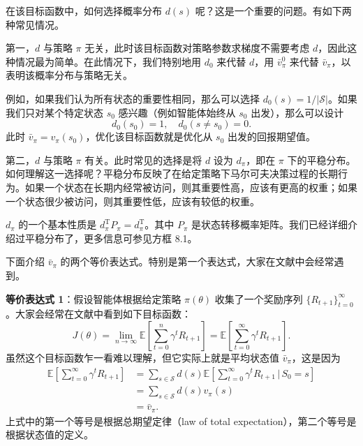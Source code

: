 在该目标函数中，如何选择概率分布 $d(s)$ 呢？这是一个重要的问题。有如下两种常见情况。

第一，$d$ 与策略 $\pi$ 无关，此时该目标函数对策略参数求梯度不需要考虑 $d$，因此这种情况最为简单。在此情况下，我们特别地用 $d_0$ 来代替 $d$，用 $\bar{v}_{\pi}^{0}$ 来代替 $\bar{v}_{\pi}$，以表明该概率分布与策略无关。

例如，如果我们认为所有状态的重要性相同，那么可以选择 $d_0(s) = 1 / |\mathcal{S}|$。如果我们只对某个特定状态 $s_0$ 感兴趣（例如智能体始终从 $s_0$ 出发），那么可以设计
\begin{equation}
d_0(s_0) = 1, \quad d_0(s \neq s_0) = 0.
\end{equation}
此时 $\bar{v}_{\pi} = v_{\pi}(s_0)$，优化该目标函数就是优化从 $s_0$ 出发的回报期望值。

第二，$d$ 与策略 $\pi$ 有关。此时常见的选择是将 $d$ 设为 $d_{\pi}$，即在 $\pi$ 下的平稳分布。如何理解这一选择呢？平稳分布反映了在给定策略下马尔可夫决策过程的长期行为。如果一个状态在长期内经常被访问，则其重要性高，应该有更高的权重；如果一个状态很少被访问，则其重要性低，应该有较低的权重。

$d_{\pi}$ 的一个基本性质是 $d_{\pi}^{\mathrm{T}}P_{\pi} = d_{\pi}^{\mathrm{T}}$。其中 $P_{\pi}$ 是状态转移概率矩阵。我们已经详细介绍过平稳分布了，更多信息可参见方框 8.1。

下面介绍 $\bar{v}_{\pi}$ 的两个等价表达式。特别是第一个表达式，大家在文献中会经常遇到。

\textbf{等价表达式 1}：假设智能体根据给定策略 $\pi(\theta)$ 收集了一个奖励序列 $\{R_{t+1}\}_{t=0}^{\infty}$。大家会经常在文献中看到如下目标函数：
\begin{equation}
J(\theta) = \lim_{n \to \infty} \mathbb{E}\left[ \sum_{t=0}^{n} \gamma^{t} R_{t+1} \right] = \mathbb{E}\left[ \sum_{t=0}^{\infty} \gamma^{t} R_{t+1} \right].
\label{eq:rl-pg-vbar-disc-series}
\end{equation}
虽然这个目标函数乍一看难以理解，但它实际上就是平均状态值 $\bar{v}_{\pi}$，这是因为
\begin{equation}
\begin{aligned}
\mathbb{E}\left[ \sum_{t=0}^{\infty} \gamma^{t} R_{t+1} \right]
&= \sum_{s \in \mathcal{S}} d(s) \mathbb{E}\left[ \sum_{t=0}^{\infty} \gamma^{t} R_{t+1} \,\Big|\, S_0 = s \right] \\
&= \sum_{s \in \mathcal{S}} d(s) v_{\pi}(s) \\
&= \bar{v}_{\pi}.
\end{aligned}
\end{equation}
上式中的第一个等号是根据总期望定律（law of total expectation），第二个等号是根据状态值的定义。

